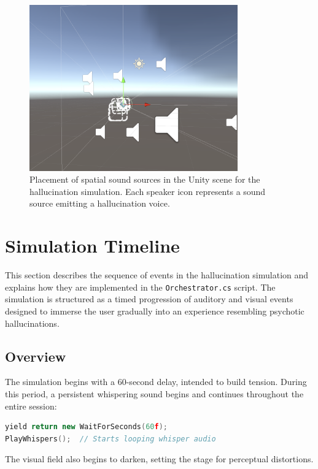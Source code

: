 \begin{figure}[h!] \centering \includegraphics[width=0.8\textwidth]{../../Figures/unity-scene.png} \caption{Placement of spatial sound sources in the Unity scene for the hallucination simulation. Each speaker icon represents a sound source emitting a hallucination voice.} \label{fig:sound_sources} \end{figure}

\section{Simulation Timeline}
This section describes the sequence of events in the hallucination simulation and explains how they are implemented in the \texttt{Orchestrator.cs} script. The simulation is structured as a timed progression of auditory and visual events designed to immerse the user gradually into an experience resembling psychotic hallucinations.

\subsection{Overview}

The simulation begins with a 60-second delay, intended to build tension. During this period, a persistent whispering sound begins and continues throughout the entire session:

\begin{lstlisting}[language=C++, caption={Start of Orchestration}, label={lst:orchestrator_start}]
yield return new WaitForSeconds(60f);
PlayWhispers();  // Starts looping whisper audio
\end{lstlisting}

The visual field also begins to darken, setting the stage for perceptual distortions.

